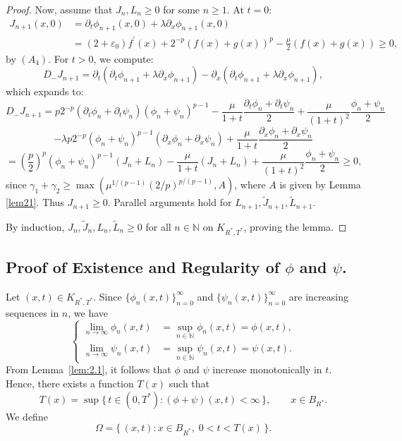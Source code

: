 \documentclass[
  sn-mathphys-num,
  colorlinks,
  linkcolor=darkmagenta,
  citecolor=rufous,
  urlcolor=zaffre,
  hypertexnames=false
]{sn-jnl}
\numberwithin{equation}{section}
\begin{document}
\begin{proof}
Now, assume that $J_n, L_n \geq 0$ for some $n \geq 1$. At $t=0$:
$$\begin{aligned}
J_{n+1}(x,0) &= \partial_t \phi_{n+1}(x,0) + \lambda \partial_x \phi_{n+1}(x,0) \\ &= (2+\varepsilon_0)f^\prime(x) + 2^{-p}(f(x)+g(x))^p - \frac{\mu}{2}(f(x)+g(x)) \geq 0,
\end{aligned}
$$
by $(A_4)$. For $t>0$, we compute:
$$
D_- J_{n+1} = \partial_t(\partial_t \phi_{n+1} + \lambda \partial_x \phi_{n+1}) - \partial_x(\partial_t \phi_{n+1} + \lambda \partial_x \phi_{n+1}),
$$
which expands to:
$$
D_- J_{n+1} = p2^{-p}(\partial_t \phi_n + \partial_t \psi_n)(\phi_n + \psi_n)^{p-1} - \frac{\mu}{1+t}\frac{\partial_t \phi_n + \partial_t \psi_n}{2} + \frac{\mu}{(1+t)^2}\frac{\phi_n + \psi_n}{2} 
$$
$$
- \lambda p2^{-p}(\phi_n + \psi_n)^{p-1}(\partial_x \phi_n + \partial_x \psi_n) + \frac{\mu}{1+t}\frac{\partial_x \phi_n + \partial_x \psi_n}{2}
$$
$$
= \left(\frac{p}{2}\right)^p (\phi_n + \psi_n)^{p-1}(J_n + L_n) - \frac{\mu}{1+t}(J_n + L_n) + \frac{\mu}{(1+t)^2}\frac{\phi_n + \psi_n}{2} \geq 0,
$$
since $\gamma_1 + \gamma_2 \geq \max(\mu^{1/(p-1)}(2/p)^{p/(p-1)},A)$, where $A$ is given by Lemma \ref{lem21}. Thus $J_{n+1} \geq 0$. Parallel arguments hold for $L_{n+1}, \tilde{J}_{n+1}, \tilde{L}_{n+1}$.

\medskip
\noindent
By induction, $J_n, \tilde{J}_n, L_n, \tilde{L}_n \geq 0$ for all $n \in \mathbb{N}$ on $K_{R^*,T^*}$, proving the lemma.
\end{proof}

\subsection*{Proof of Existence and Regularity of $\phi$ and $\psi$.}

Let $(x,t) \in K_{R^*, T^*}$. Since $\{\phi_n(x,t)\}_{n=0}^\infty$ and $\{\psi_n(x,t)\}_{n=0}^\infty$ are increasing sequences in $n$, we have
\begin{equation}
\left\{
  \begin{aligned}
    \lim_{n \to \infty} \phi_n(x,t) &= \sup_{n \in \mathbb{N}} \phi_n(x,t) = \phi(x,t), \\
    \lim_{n \to \infty} \psi_n(x,t) &= \sup_{n \in \mathbb{N}} \psi_n(x,t) = \psi(x,t).
  \end{aligned}
    \label{2.3}
    \right.
\end{equation}
From Lemma~\ref{lem:2.1}, it follows that $\phi$ and $\psi$ increase monotonically in $t$. Hence, there exists a function $T(x)$ such that
$$
  T(x) = \sup \{\, t \in (0, T^*) : (\phi + \psi)(x,t) < \infty \,\}, \qquad x \in B_{R^*}.
$$
We define
\begin{equation}
    \label{omega}
  \Omega = \{\, (x,t) : x \in B_{R^*}, \; 0 < t < T(x) \,\}.
\end{equation}
\end{document}
